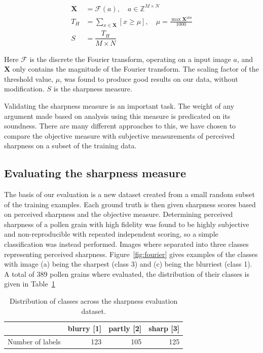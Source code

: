 \begin{equation}\label{eq:sharp}
  \begin{split}
    \mathbf{X} &= \mathcal{F}(a),\quad a\in \mathbb{Z}^{M\times N}\\
    T_H &= \sum_{x\in\mathbf{X}}[x\ge\mu],\quad \mu=\frac{\max \mathbf{X^{\mathrm{abs}}}}{1000}\\
    S &= \dfrac{T_H}{M\times N}
  \end{split}
\end{equation}

Here \(\mathcal{F}\) is the discrete the Fourier transform, operating on a input image \(a\), and \(\mathbf{X}\) only contains the magnitude of the Fourier transform.
The scaling factor of the threshold value, \(\mu \), was found to produce good results on our data, without modification. \(S\) is the sharpness measure.

Validating the sharpness measure is an important task.
The weight of any argument made based on analysis using this measure is predicated on its soundness.
There are many different approaches to this, we have chosen to compare the objective measure with subjective measurements of perceived sharpness on a subset of the training data.

\subsection{Evaluating the sharpness measure}
The basis of our evaluation is a new dataset created from a small random subset of the training examples.
Each ground truth is then given sharpness scores based on perceived sharpness and the objective measure.
Determining perceived sharpness of a pollen grain with high fidelity was found to be highly subjective and non-reproducible with repeated independent scoring, so a simple classification was instead performed.
Images where separated into three classes representing perceived sharpness.
Figure~\ref{fig:fourier} gives examples of the classes with image (a) being the sharpest (class 3) and (c) being the blurriest (class 1).
A total of 389 pollen grains where evaluated, the distribution of their classes is given in Table~\ref{tab:sharpness}

\begin{table}[htbp]
  \caption[Sharpness dataset distribution]{Distribution of classes across the sharpness evaluation dataset.}\label{tab:sharpness}
  \centering 
  \begin{tabular}{lrrr} \toprule
    & blurry [1] & partly [2] & sharp [3]  \\ \midrule
    Number of labels & 123 & 105 & 125 \\ \bottomrule
  \end{tabular}
\end{table}

